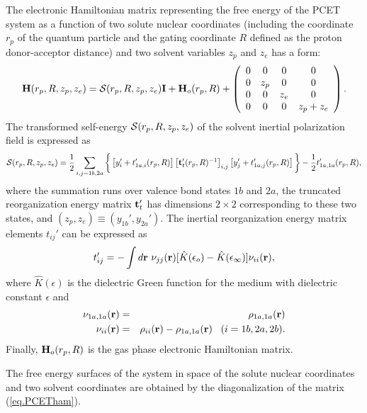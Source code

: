 \documentclass[oneside,11pt,openany]{book}
\begin{document}
The electronic Hamiltonian matrix representing the free energy
of the PCET system as a function of two solute nuclear coordinates
(including the coordinate $r_p$ of the quantum particle and the gating
coordinate $R$ defined as the proton donor-acceptor distance) and
two solvent variables $z_p$ and $z_e$ has a form:
\begin{equation}
{\bf H}(r_p,R,z_p,z_e) = {\cal{S}}(r_p,R,z_p,z_e){\bf I}+ {\bf H}_o(r_p,R)
+
\left(
\begin{array}{cccc}
0&0&0&0 \\
0&z_p&0&0 \\
0&0&z_e&0 \\
0&0&0&z_p+z_e 
\end{array}
\right).
\label{eq.PCETham}
\end{equation}
The transformed self-energy ${\cal{S}}(r_p,R,z_p,z_e)$ of the solvent
inertial polarization field is expressed as
%
\begin{equation}
{\cal{S}}(r_p,R,z_p,z_e)=\frac{1}{2} \sum_{i,j=1b,2a}\bigg\{
\left[ y_{i}'+t_{1a,i}'(r_p,R)\right] \left[
{\bf t}_t'(r_p,R)^{-1}\right]_{i,j}\left[ y_{j}'+t_{1a,j}'(r_p,R)\right]
\bigg\} -\frac{1}{2} t'_{1a,1a}(r_p,R),
\end{equation}
%
where the summation runs over valence bond states $1b$ and $2a$,
the truncated reorganization energy matrix ${\bf t}_t'$ has
dimensions $2\times 2$ corresponding to these two states,
and $(z_p,z_e)\equiv (y_{1b}',y_{2a}')$. The inertial
reorganization energy matrix elements $t_{ij}'$ can
be expressed as
%
\begin{equation}
t_{ij}'=-\int d{\bf r}\,\, \nu_{jj}({\bf r})
[\hat{K}(\epsilon_o)-\hat{K}(\epsilon_\infty)]\nu_{ii}({\bf r}),
\end{equation}
%
where $\hat{K}(\epsilon)$ is the dielectric Green function
for the medium with dielectric constant $\epsilon$ and
%
\begin{eqnarray}
\nu_{1a,1a}({\bf r})&=&\rho_{1a,1a}({\bf r}) \nonumber \\
\nu_{ii}({\bf r})&=&\rho_{ii}({\bf r})-\rho_{1a,1a}({\bf r})\,\,\,\,\,
(i=1b,2a,2b).
\end{eqnarray}
%
Finally, ${\bf H}_o(r_p,R)$ is the gas phase electronic Hamiltonian
matrix.

The free energy surfaces of the system in space of the solute nuclear
coordinates and two solvent coordinates are obtained by the
diagonalization of the matrix (\ref{eq.PCETham}).

\end{document}
